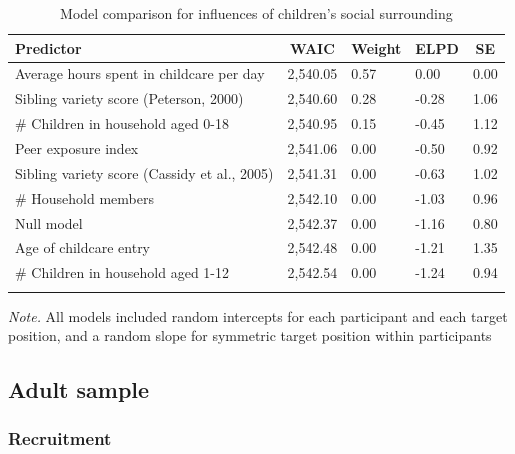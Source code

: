 \documentclass[
  man,floatsintext]{apa6}
\begin{document}
\begin{table}[tbp]

\begin{center}
\begin{threeparttable}

\caption{\label{tab:extvali_table}Model comparison for influences of children's social surrounding}

\begin{tabular}{lllll}
\toprule
Predictor & \multicolumn{1}{c}{WAIC} & \multicolumn{1}{c}{Weight} & \multicolumn{1}{c}{ELPD} & \multicolumn{1}{c}{SE}\\
\midrule
Average hours spent in childcare per day & 2,540.05 & 0.57 & 0.00 & 0.00\\
Sibling variety score (Peterson, 2000) & 2,540.60 & 0.28 & -0.28 & 1.06\\
\# Children in household aged 0-18 & 2,540.95 & 0.15 & -0.45 & 1.12\\
Peer exposure index & 2,541.06 & 0.00 & -0.50 & 0.92\\
Sibling variety score (Cassidy et al., 2005) & 2,541.31 & 0.00 & -0.63 & 1.02\\
\# Household members & 2,542.10 & 0.00 & -1.03 & 0.96\\
Null model & 2,542.37 & 0.00 & -1.16 & 0.80\\
Age of childcare entry & 2,542.48 & 0.00 & -1.21 & 1.35\\
\# Children in household aged 1-12 & 2,542.54 & 0.00 & -1.24 & 0.94\\
\bottomrule
\addlinespace
\end{tabular}

\begin{tablenotes}[para]
\normalsize{\textit{Note.} All models included random intercepts for each participant and each target position, and a random slope for symmetric target position within participants}
\end{tablenotes}

\end{threeparttable}
\end{center}

\end{table}

\hypertarget{adult-sample}{%
\subsection{Adult sample}\label{adult-sample}}

\hypertarget{recruitment}{%
\subsubsection{Recruitment}\label{recruitment}}
\end{document}

